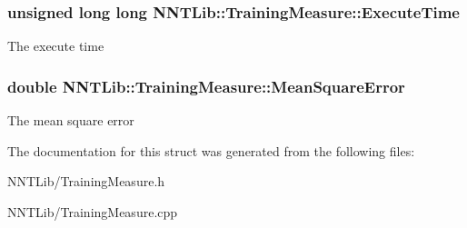 \subsubsection[{Execute\+Time}]{\setlength{\rightskip}{0pt plus 5cm}unsigned long long N\+N\+T\+Lib\+::\+Training\+Measure\+::\+Execute\+Time}\label{struct_n_n_t_lib_1_1_training_measure_abbe43852bac79bd5b7acfe6151464c37}


The execute time 

\hypertarget{struct_n_n_t_lib_1_1_training_measure_a03470415cd36f35e43b3ad0e784bbbbf}{}
\subsubsection[{Mean\+Square\+Error}]{\setlength{\rightskip}{0pt plus 5cm}double N\+N\+T\+Lib\+::\+Training\+Measure\+::\+Mean\+Square\+Error}\label{struct_n_n_t_lib_1_1_training_measure_a03470415cd36f35e43b3ad0e784bbbbf}


The mean square error 



The documentation for this struct was generated from the following files\+:\begin{DoxyCompactItemize}
\item 
N\+N\+T\+Lib/Training\+Measure.\+h\item 
N\+N\+T\+Lib/Training\+Measure.\+cpp\end{DoxyCompactItemize}

